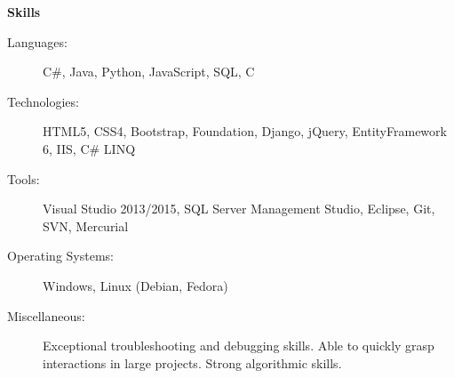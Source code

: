 \documentclass[letterpaper,11pt]{article}
\newcommand{\resheading}[1]{{\large \colorbox{mygrey}{\begin{minipage}{\textwidth}{\textbf{#1 \vphantom{p\^{E}}}}\end{minipage}}}}
\begin{document}
\resheading{Skills}
\begin{description}
\item[Languages:]
C\#, Java, Python, JavaScript, SQL, C
\item[Technologies:]
HTML5, CSS4, Bootstrap, Foundation, Django, jQuery, EntityFramework 6, IIS, C\# LINQ
\item[Tools:]
Visual Studio 2013/2015, SQL Server Management Studio, Eclipse, Git, SVN, Mercurial
\item[Operating Systems:]
Windows, Linux (Debian, Fedora)
\item[Miscellaneous:]
Exceptional troubleshooting and debugging skills. Able to quickly grasp interactions in large projects.
Strong algorithmic skills.
\end{description}
\end{document}

